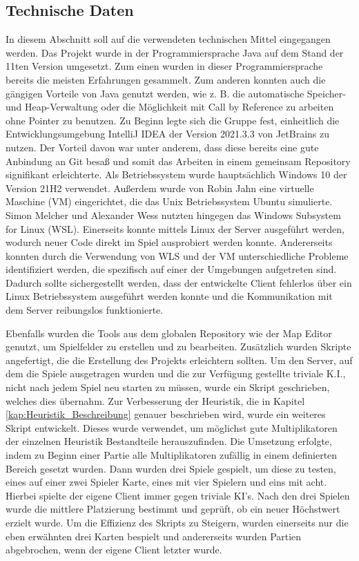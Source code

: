 \documentclass[12pt,a4paper,bibliography=totocnumbered,listof=totocnumbered]{article}
\begin{document}
\subsection{Technische Daten}
In diesem Abschnitt soll auf die verwendeten technischen Mittel eingegangen werden. Das Projekt wurde in der Programmiersprache Java auf dem Stand der 11ten Version umgesetzt. Zum einen wurden in dieser Programmiersprache bereits die meisten Erfahrungen gesammelt. Zum anderen konnten auch die gängigen Vorteile von Java genutzt werden, wie z. B. die automatische Speicher- und Heap-Verwaltung oder die Möglichkeit mit \glqq Call by Reference\grqq{} zu arbeiten ohne Pointer zu benutzen.
Zu Beginn legte sich die Gruppe fest, einheitlich die Entwicklungsumgebung IntelliJ IDEA der Version 2021.3.3 von JetBrains zu nutzen. Der Vorteil davon war unter anderem, dass diese bereits eine gute Anbindung an Git besaß und somit das Arbeiten in einem gemeinsam Repository signifikant erleichterte.
Als Betriebssystem wurde hauptsächlich Windows 10 der Version 21H2 verwendet. Außerdem wurde von Robin Jahn eine virtuelle Maschine (VM) eingerichtet, die das Unix Betriebssystem Ubuntu simulierte. Simon Melcher und Alexander Wess nutzten hingegen das Windows Subsystem for Linux (WSL). Einerseits konnte mittels Linux der Server ausgeführt werden, wodurch neuer Code direkt im Spiel ausprobiert werden konnte. Andererseits konnten durch die Verwendung von WLS und der VM unterschiedliche Probleme identifiziert werden, die spezifisch auf einer der Umgebungen aufgetreten sind. Dadurch sollte sichergestellt werden, dass der entwickelte Client fehlerlos über ein Linux Betriebssystem ausgeführt werden konnte und die Kommunikation mit dem Server reibungslos funktionierte.

Ebenfalls wurden die Tools aus dem globalen Repository wie der Map Editor genutzt, um Spielfelder zu erstellen und zu bearbeiten. Zusätzlich wurden Skripte angefertigt, die die Erstellung des Projekts erleichtern sollten. Um den Server, auf dem die Spiele ausgetragen wurden und die zur Verfügung gestellte triviale K.I., nicht nach jedem Spiel neu starten zu müssen, wurde ein Skript geschrieben, welches dies übernahm. Zur Verbesserung der Heuristik, die in Kapitel \ref{kap:Heuristik_Beschreibung} genauer beschrieben wird, wurde ein weiteres Skript entwickelt. Dieses wurde verwendet, um möglichst gute Multiplikatoren der einzelnen Heuristik Bestandteile herauszufinden. Die Umsetzung erfolgte, indem zu Beginn einer Partie alle Multiplikatoren zufällig in einem definierten Bereich gesetzt wurden. Dann wurden drei Spiele gespielt, um diese zu testen, eines auf einer zwei Spieler Karte, eines mit vier Spielern und eins mit acht. Hierbei spielte der eigene Client immer gegen triviale KI's. Nach den drei Spielen wurde die mittlere Platzierung bestimmt und geprüft, ob ein neuer Höchstwert erzielt wurde. Um die Effizienz des Skripts zu Steigern, wurden einerseits nur die eben erwähnten drei Karten bespielt und andererseits wurden Partien abgebrochen, wenn der eigene Client letzter wurde.
\end{document}
